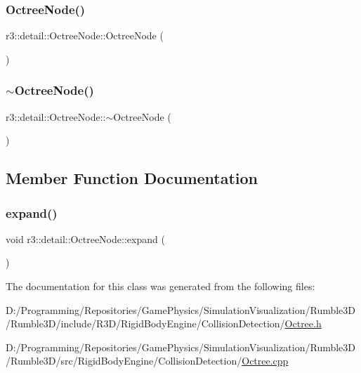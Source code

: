 \subsubsection{\texorpdfstring{Octree\+Node()}{OctreeNode()}}
{\footnotesize\ttfamily r3\+::detail\+::\+Octree\+Node\+::\+Octree\+Node (\begin{DoxyParamCaption}{ }\end{DoxyParamCaption})\hspace{0.3cm}{\ttfamily [explicit]}}

\mbox{\label{classr3_1_1detail_1_1_octree_node_aad03f7781769d54ec136cd29d1444046}} 
\subsubsection{\texorpdfstring{$\sim$\+Octree\+Node()}{~OctreeNode()}}
{\footnotesize\ttfamily r3\+::detail\+::\+Octree\+Node\+::$\sim$\+Octree\+Node (\begin{DoxyParamCaption}{ }\end{DoxyParamCaption})}



\subsection{Member Function Documentation}
\mbox{\label{classr3_1_1detail_1_1_octree_node_a7fed2d9ab9f17979add0276a4be6a2fe}} 
\subsubsection{\texorpdfstring{expand()}{expand()}}
{\footnotesize\ttfamily void r3\+::detail\+::\+Octree\+Node\+::expand (\begin{DoxyParamCaption}{ }\end{DoxyParamCaption})}



The documentation for this class was generated from the following files\+:\begin{DoxyCompactItemize}
\item 
D\+:/\+Programming/\+Repositories/\+Game\+Physics/\+Simulation\+Visualization/\+Rumble3\+D/\+Rumble3\+D/include/\+R3\+D/\+Rigid\+Body\+Engine/\+Collision\+Detection/\mbox{\hyperlink{_octree_8h}{Octree.\+h}}\item 
D\+:/\+Programming/\+Repositories/\+Game\+Physics/\+Simulation\+Visualization/\+Rumble3\+D/\+Rumble3\+D/src/\+Rigid\+Body\+Engine/\+Collision\+Detection/\mbox{\hyperlink{_octree_8cpp}{Octree.\+cpp}}\end{DoxyCompactItemize}
